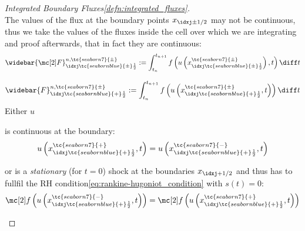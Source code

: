 \begin{proofbox}\nospacing
    \begin{proof}[Integrated Boundary Fluxes\cref{defn:integrated_fluxes}]\label{proof:defn:integrated_fluxes}\leavevmode\\
      The values of the flux at the boundary points $x_{\idxj\pm1/2}$ may not be continuous, thus we take the values of the fluxes inside the cell over which we are integrating and proof afterwards, that in fact they are continuous:
        \begin{align}
          \widebar{\Flux}_{\idxj\tc{seabornblue}{\pm}\frac{1}{2}}^{n,\tc{seaborn7}{\pm}}:=\int_{t_{n}}^{t_{n+1}}f \left(u\left(x_{\idxj\tc{seabornblue}{\pm}\frac{1}{2}}^{\tc{seaborn7}{\pm}}\right),t\right)\diff t\label{eq:integrated_fluxes}
        \end{align}
        \begin{figure}[H]
            \centering{
              \def\svgwidth{200pt}
              \resizebox{0.9\linewidth}{!}{}
            }
        \end{figure}
               \begin{align*}
          \widebar{F}_{\idxj\tc{seabornblue}{+}\frac{1}{2}}^{n,\tc{seaborn7}{\pm}}
          :=\int_{t_{n}}^{t_{n+1}}f \left(u\left(x_{\idxj\tc{seabornblue}{+}\frac{1}{2}}^{\tc{seaborn7}{\pm}},t\right)\right)\diff t
        \end{align*}
        Either $u$
        \begin{itemizenosep}
            \item is continuous at the boundary:
                \begin{align*}
                u\left(x_{\idxj\tc{seabornblue}{+}\frac{1}{2}}^{\tc{seaborn7}{+}},t\right)
                =u\left(x_{\idxj\tc{seabornblue}{+}\frac{1}{2}}^{\tc{seaborn7}{-}},t\right)
                \end{align*}
                \item or is a \textit{stationary} (for $t=0$) shock at the boundaries $x_{\idxj+1/2}$
                and thus has to fullfil the RH condition\cref{eq:rankine-hugoniot_condition} with $s(t)=0$:
            \begin{align*}
             \flux\left(u\left(x_{\idxj\tc{seabornblue}{+}\frac{1}{2}}^{\tc{seaborn7}{-}},t\right)\right)
              =\flux\left(u\left(x_{\idxj\tc{seabornblue}{+}\frac{1}{2}}^{\tc{seaborn7}{+}},t\right)\right)
            \end{align*}

\end{itemizenosep}
\end{proof}
\end{proofbox}
